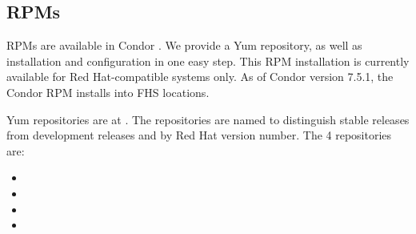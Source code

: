 

\subsection{\label{sec:install-rpms} RPMs}

RPMs are available in Condor \VersionNotice.
We provide a Yum repository, as well as 
installation and configuration in one easy step.
This RPM installation is currently available for Red Hat-compatible
systems only.
As of Condor version 7.5.1, 
the Condor RPM installs into FHS locations.

Yum repositories are at
  .
The repositories are named to distinguish stable releases from
development releases and by Red Hat version number. 
The 4 repositories are:
\begin{itemize}
  \item {}
  \item {}
  \item {}
  \item {}
\end{itemize}

